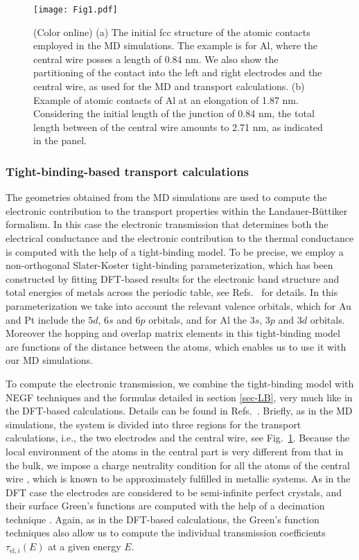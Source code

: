\documentclass[aps,amsmath,amssymb,twocolumn,showpacs]{revtex4-1}
\begin{document}
%
\begin{figure}[t]
\begin{center} \texttt{[image: Fig1.pdf]} \end{center}
\caption{(Color online) (a) The initial fcc structure of the atomic contacts
  employed in the MD simulations. The example is for Al, where the central
  wire posses a length of 0.84 nm. We also show the partitioning of the
  contact into the left and right electrodes and the central wire, as used for
  the MD and transport calculations. (b) Example of atomic contacts of Al at
  an elongation of 1.87 nm. Considering the initial length of the junction of
  0.84 nm, the total length between of the central wire amounts to 2.71 nm, as
  indicated in the panel.}
\label{fig-geometry}
\end{figure}
%

\subsubsection{Tight-binding-based transport calculations}

The geometries obtained from the MD simulations are used to compute the
electronic contribution to the transport properties within the
Landauer-B\"uttiker formalism. In this case the electronic transmission that
determines both the electrical conductance and the electronic contribution to
the thermal conductance is computed with the help of a tight-binding model. To
be precise, we employ a non-orthogonal Slater-Koster tight-binding
parameterization, which has been constructed by fitting
  DFT-based results for the electronic band structure and total energies of
  metals across the periodic table, see
  Refs.~ for details. In this
parameterization we take into account the relevant valence orbitals, which for
Au and Pt include the $5d$, $6s$ and $6p$ orbitals, and for Al the $3s$, $3p$
and $3d$ orbitals. Moreover the hopping and overlap matrix elements in this
tight-binding model are functions of the distance between the atoms, which
enables us to use it with our MD simulations.

To compute the electronic transmission, we combine the tight-binding model
with NEGF techniques and the formulas detailed in section \ref{sec-LB}, very
much like in the DFT-based calculations. Details can be found in
Refs.~. Briefly, as in the MD simulations,
the system is divided into three regions for the transport calculations, i.e.,
the two electrodes and the central wire, see Fig.~\ref{fig-geometry}. Because
the local environment of the atoms in the central part is very different from
that in the bulk, we impose a charge neutrality condition for all the atoms of
the central wire \cite{Dreher2005,Pauly2006}, which is known to be
approximately fulfilled in metallic systems. As in the DFT case the electrodes
are considered to be semi-infinite perfect crystals, and their surface Green's
functions are computed with the help of a decimation technique
\cite{Pauly2008,Guinea1983}.  Again, as in the DFT-based calculations, the
Green's function techniques also allow us to compute the individual
transmission coefficients $\tau_{\text{el},i}(E)$ at a given energy $E$.
\end{document}
